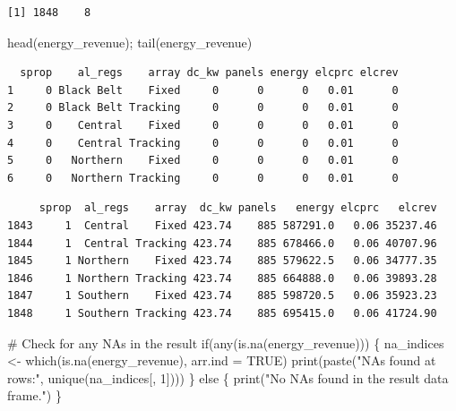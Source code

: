 \documentclass[
  letterpaper,
  DIV=11,
  numbers=noendperiod]{scrartcl}
\newenvironment{Shaded}{\begin{snugshade}}{\end{snugshade}}
\newcommand{\AttributeTok}[1]{\textcolor[rgb]{0.40,0.45,0.13}{#1}}
\newcommand{\CommentTok}[1]{\textcolor[rgb]{0.37,0.37,0.37}{#1}}
\newcommand{\ConstantTok}[1]{\textcolor[rgb]{0.56,0.35,0.01}{#1}}
\newcommand{\ControlFlowTok}[1]{\textcolor[rgb]{0.00,0.23,0.31}{#1}}
\newcommand{\DecValTok}[1]{\textcolor[rgb]{0.68,0.00,0.00}{#1}}
\newcommand{\FunctionTok}[1]{\textcolor[rgb]{0.28,0.35,0.67}{#1}}
\newcommand{\NormalTok}[1]{\textcolor[rgb]{0.00,0.23,0.31}{#1}}
\newcommand{\OtherTok}[1]{\textcolor[rgb]{0.00,0.23,0.31}{#1}}
\newcommand{\StringTok}[1]{\textcolor[rgb]{0.13,0.47,0.30}{#1}}
\begin{document}
\begin{verbatim}
[1] 1848    8
\end{verbatim}

\begin{Shaded}
\begin{Highlighting}[]
\FunctionTok{head}\NormalTok{(energy\_revenue); }\FunctionTok{tail}\NormalTok{(energy\_revenue)}
\end{Highlighting}
\end{Shaded}

\begin{verbatim}
  sprop    al_regs    array dc_kw panels energy elcprc elcrev
1     0 Black Belt    Fixed     0      0      0   0.01      0
2     0 Black Belt Tracking     0      0      0   0.01      0
3     0    Central    Fixed     0      0      0   0.01      0
4     0    Central Tracking     0      0      0   0.01      0
5     0   Northern    Fixed     0      0      0   0.01      0
6     0   Northern Tracking     0      0      0   0.01      0
\end{verbatim}

\begin{verbatim}
     sprop  al_regs    array  dc_kw panels   energy elcprc   elcrev
1843     1  Central    Fixed 423.74    885 587291.0   0.06 35237.46
1844     1  Central Tracking 423.74    885 678466.0   0.06 40707.96
1845     1 Northern    Fixed 423.74    885 579622.5   0.06 34777.35
1846     1 Northern Tracking 423.74    885 664888.0   0.06 39893.28
1847     1 Southern    Fixed 423.74    885 598720.5   0.06 35923.23
1848     1 Southern Tracking 423.74    885 695415.0   0.06 41724.90
\end{verbatim}

\begin{Shaded}
\begin{Highlighting}[]
\CommentTok{\# Check for any NAs in the result}
\ControlFlowTok{if}\NormalTok{(}\FunctionTok{any}\NormalTok{(}\FunctionTok{is.na}\NormalTok{(energy\_revenue))) \{}
\NormalTok{  na\_indices }\OtherTok{\textless{}{-}} \FunctionTok{which}\NormalTok{(}\FunctionTok{is.na}\NormalTok{(energy\_revenue), }\AttributeTok{arr.ind =} \ConstantTok{TRUE}\NormalTok{)}
  \FunctionTok{print}\NormalTok{(}\FunctionTok{paste}\NormalTok{(}\StringTok{"NAs found at rows:"}\NormalTok{, }\FunctionTok{unique}\NormalTok{(na\_indices[, }\DecValTok{1}\NormalTok{])))}
\NormalTok{\} }\ControlFlowTok{else}\NormalTok{ \{}
  \FunctionTok{print}\NormalTok{(}\StringTok{"No NAs found in the result data frame."}\NormalTok{)}
\NormalTok{\}}
\end{Highlighting}
\end{Shaded}
\end{document}
